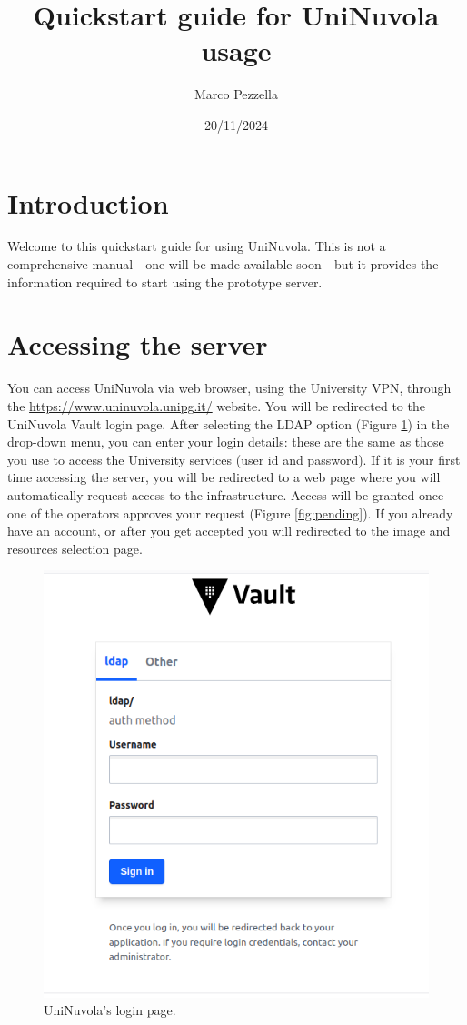 \documentclass[a4paper,11pt]{article}
\begin{document}
\title{Quickstart guide for UniNuvola usage}
\author{Marco Pezzella}
\date{20/11/2024}

\maketitle

\section{Introduction}

Welcome to this quickstart guide for using UniNuvola. This is not a comprehensive manual—one will be made available soon—but it provides the information required to start using the prototype server.

\section{Accessing the server}

You can access UniNuvola via web browser, using the University VPN, through the  \href{https://www.uninuvola.unipg.it/}{https://www.uninuvola.unipg.it/} website. You will be redirected to the UniNuvola Vault login page. After selecting the LDAP option (Figure \ref{fig:login}) in the drop-down menu, you can enter your login details: these are the same as those you use to access the University services (user id and password). If it is your first time accessing the server, you will be redirected to a web page  where you will automatically request access to the infrastructure. Access will be granted once one of the operators approves your request (Figure \ref{fig:pending}). If you already have an account, or after you get accepted you will redirected to the image and resources selection page. 


\begin{figure}[!ht]
    \centering
    \includegraphics[width=0.5\linewidth]{img/login_page.png}
    \caption{UniNuvola's login page.}
    \label{fig:login}
\end{figure}
\end{document}
